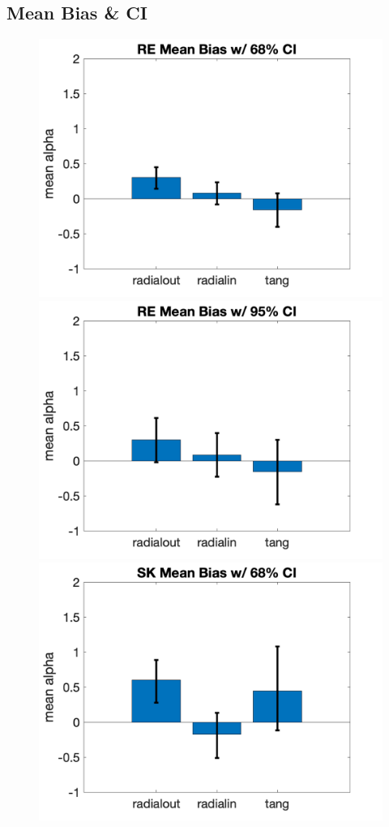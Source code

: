 \documentclass[11pt]{article} %
\begin{document}
\subsection{Mean Bias \& CI}
\begin{figure}[H]
\centering %
\includegraphics[scale=.2]{Images/MeanBiasError_68ci_RE.png}
\includegraphics[scale=.2]{Images/MeanBiasError_95ci_RE.png}
\includegraphics[scale=.2]{Images/MeanBiasError_68ci_SK.png}

\end{figure}
\end{document}
